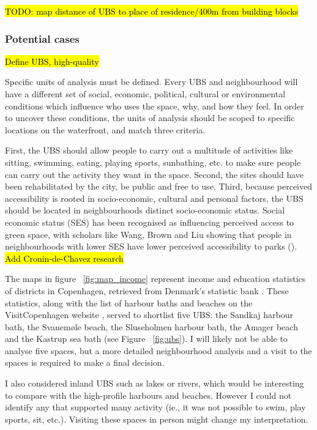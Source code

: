 \documentclass{article}
\begin{document}
\hl{TODO: map distance of UBS to place of residence/400m from building blocks}

\subsubsection{Potential cases}

\hl{Define UBS, high-quality}

Specific units of analysis must be defined. Every UBS and neighbourhood will have a different set of social, economic, political, cultural or environmental conditions which influence who uses the space, why, and how they feel. In order to uncover these conditions, the units of analysis should be scoped to specific locations on the waterfront, and match three criteria. 

First, the UBS should allow people to carry out a multitude of activities like sitting, swimming, eating, playing sports, sunbathing, etc. to make sure people can carry out the activity they want in the space.
Second, the sites should have been rehabilitated by the city, be public and free to use.
Third, because perceived accessibility is rooted in socio-economic, cultural and personal factors, the UBS should be located in neighbourhoods distinct socio-economic status. Social economic status (SES) has been recognised as influencing perceived access to green space, with scholars like Wang, Brown and Liu showing that people in neighbourhoods with lower SES have lower perceived accessibility to parks (\citeyear{wang2015physical}). \hl{Add Cronin-de-Chavez research}

The maps in figure ~\ref{fig:map_income} represent income and education statistics of districts in Copenhagen, retrieved from Denmark's statistic bank \parencite{copenhagenStatbank}. These statistics, along with the list of harbour baths and beaches on the VisitCopenhagen website \parencite{visitcopenhagen_baths}, served to shortlist five UBS: the Sandkaj harbour bath, the Svanemøle beach, the Sluseholmen harbour bath, the Amager beach and the Kastrup sea bath (see Figure ~\ref{fig:ubs}). I will likely not be able to analyse five spaces, but a more detailed neighbourhood analysis and a visit to the spaces is required to make a final decision. 

I also considered inland UBS such as lakes or rivers, which would be interesting to compare with the high-profile harbours and beaches. However I could not identify any that supported many activity (ie., it was not possible to swim, play sports, sit, etc.). Visiting these spaces in person might change my interpretation.
\end{document}
